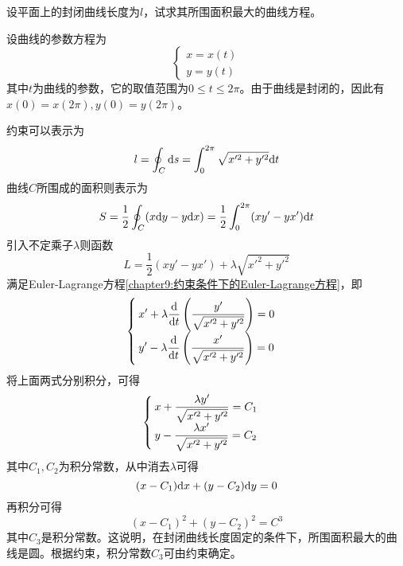 \begin{example}
设平面上的封闭曲线长度为$l$，试求其所围面积最大的曲线方程。
\end{example}
\begin{solution}
设曲线的参数方程为
\begin{equation*}
\begin{cases}
	x = x(t) \\
	y = y(t)
\end{cases}
\end{equation*}
其中$t$为曲线的参数，它的取值范围为$0\leqslant t\leqslant 2\pi$。由于曲线是封闭的，因此有$x(0)=x(2\pi),y(0)=y(2\pi)$。

约束可以表示为
\begin{equation*}
	l = \oint_C \mathrm{d} s = \int_0^{2\pi}\sqrt{x'^2+y'^2}\mathrm{d} t
\end{equation*}
曲线$C$所围成的面积则表示为
\begin{equation*}
	S = \frac12 \oint_C(x\mathrm{d} y-y\mathrm{d} x) = \frac12\int_0^{2\pi}(xy'-yx')\mathrm{d} t
\end{equation*}
引入不定乘子$\lambda$则函数
\begin{equation*}
	L = \frac12(xy'-yx')+\lambda\sqrt{x'^2+y'^2}
\end{equation*}
满足Euler-Lagrange方程\eqref{chapter9:约束条件下的Euler-Lagrange方程}，即
\begin{equation*}
\begin{cases}
	\displaystyle x'+\lambda\dfrac{\mathrm{d}}{\mathrm{d} t}\left(\frac{y'}{\sqrt{x'^2+y'^2}}\right) = 0 \\[1.5ex]
	\displaystyle y'-\lambda\dfrac{\mathrm{d}}{\mathrm{d} t}\left(\frac{x'}{\sqrt{x'^2+y'^2}}\right) = 0
\end{cases}
\end{equation*}
将上面两式分别积分，可得
\begin{equation*}
\begin{cases}
	\displaystyle x+\frac{\lambda y'}{\sqrt{x'^2+y'^2}} = C_1 \\[1.5ex]
	\displaystyle y-\frac{\lambda x'}{\sqrt{x'^2+y'^2}} = C_2
\end{cases}
\end{equation*}
其中$C_1,C_2$为积分常数，从中消去$\lambda$可得
\begin{equation*}
	(x-C_1)\mathrm{d} x+(y-C_2)\mathrm{d} y=0
\end{equation*}
再积分可得
\begin{equation*}
	(x-C_1)^2+(y-C_2)^2=C^3
\end{equation*}
其中$C_3$是积分常数。这说明，在封闭曲线长度固定的条件下，所围面积最大的曲线是圆。根据约束，积分常数$C_3$可由约束确定。
\end{solution}

